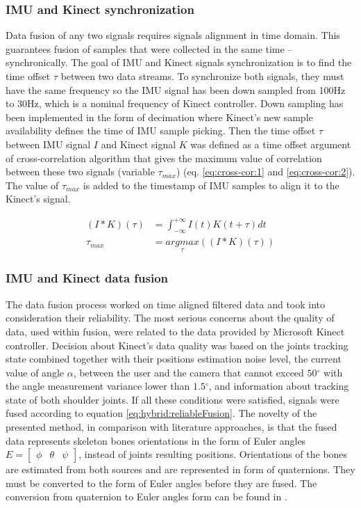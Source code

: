 \documentclass[sensors,article,submit,moreauthors,pdftex,10pt,a4paper]{mdpi}
\newcommand{\degree}{\ensuremath{{}^{\circ}}\xspace}
\begin{document}
\subsubsection{IMU and Kinect synchronization}
Data fusion of any two signals requires signals alignment in time domain. This guarantees fusion of samples that were collected in the same time -- synchronically. The goal of IMU and Kinect signals synchronization is to find the time offset $\tau$ between two data streams. To synchronize both signals, they must have the same frequency so the IMU signal has been down sampled from 100Hz to 30Hz, which is a nominal frequency of Kinect controller. Down sampling has been implemented in the form of decimation where Kinect’s new sample availability defines the time of IMU sample picking. Then the time offset $\tau$ between IMU signal $I$ and Kinect signal $K$ was defined as a time offset argument of cross-correlation algorithm that gives the maximum value of correlation between these two signals (variable $\tau_{max}$) (eq. \ref{eq:cross-cor:1} and \ref{eq:cross-cor:2}). The value of $\tau_{max}$ is added to the timestamp of IMU samples to align it to the Kinect’s signal.

\begin{subequations}
	\begin{align}
		(I \ast K)(\tau) & = \int_{-\infty}^{+\infty}I(t)K(t+\tau)dt\label{eq:cross-cor:1}   \\
		\tau_{max}       & = \underset{\tau}{argmax}((I \ast K)(\tau))\label{eq:cross-cor:2} 
	\end{align}
	\label{eq:cross-cor}
\end{subequations}



\subsubsection{IMU and Kinect data fusion}
The data fusion process worked on time aligned filtered data and took into consideration their reliability. The most serious concerns about the quality of data, used within fusion, were related to the data provided by Microsoft Kinect controller. Decision about Kinect’s data quality was based on the joints tracking state combined together with their positions estimation noise level, the current value of angle $\alpha$, between the user and the camera that cannot exceed $50\degree$ with the angle measurement variance lower than $1.5\degree$, and information about tracking state of both shoulder joints. If all these conditions were satisfied, signals were fused according to equation \ref{eq:hybrid:reliableFusion}. The novelty of the presented method, in comparison with literature approaches, is that the fused data represents skeleton bones orientations in the form of Euler angles $E = \begin{bmatrix} \phi &  \theta & \psi \end{bmatrix}$, instead of joints resulting positions. Orientations of the bones are estimated from both sources and are represented in form of quaternions. They must be converted to the form of Euler angles before they are fused. The conversion from quaternion to Euler angles form can be found in \cite{Dunn2011}.
\end{document}
